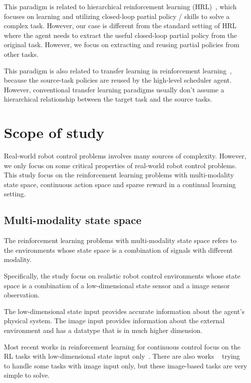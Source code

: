 This paradigm is related to hierarchical reinforcement learning (HRL)~\cite{barto2003recent}, which focuses on learning and utilizing closed-loop partial policy / skills to solve a complex task. However, our case is different from the standard setting of HRL where the agent needs to extract the useful closed-loop partial policy from the original task. However, we focus on extracting and reusing partial policies from other tasks.

This paradigm is also related to transfer learning in reinforcement learning~\cite{taylor2009transfer}, because the source-task policies are reused by the high-level scheduler agent. However, conventional transfer learning paradigms usually don't assume a hierarchical relationship between the target task and the source tasks.



\section{Scope of study}
Real-world robot control problems involves many sources of complexity. However, we only focus on some critical properties of real-world robot control problems.
This study focus on the reinforcement learning problems with multi-modality state space, continuous action space and sparse reward in a continual learning setting.

\subsection{Multi-modality state space}

The reinforcement learning problems with multi-modality state space refers to the environments whose state space is a combination of signals with different modality.

Specifically, the study focus on realistic robot control environments whose state space is a combination of a low-dimensional state sensor and a image sensor observation.

The low-dimensional state input provides accurate information about the agent's physical system. The image input provides information about the external environment and has a datatype that is in much higher dimension.

Most recent works in reinforcement learning for continuous control focus on the RL tasks with low-dimensional state input only~\cite{duan2016benchmarking}. There are also works ~\cite{wu2017scalable} trying to handle some tasks with image input only, but these image-based tasks are very simple to solve.

